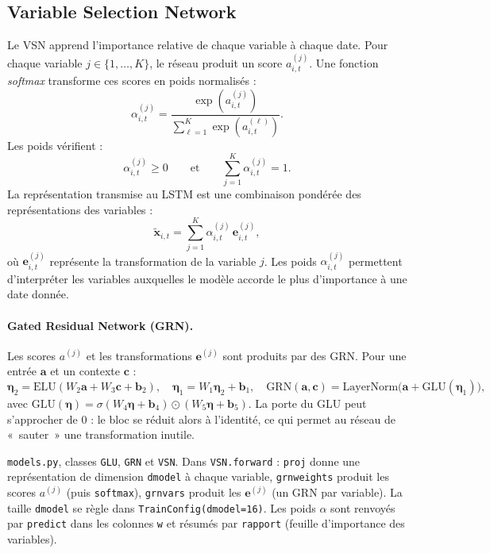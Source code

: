 \documentclass[11pt,a4paper]{article}
\renewcommand{\_}{\usorig\allowbreak}   %
\newcommand{\f}[1]{\texttt{#1}}        %
\begin{document}
\subsection{Variable Selection Network}\label{sec:vsn}
Le VSN apprend l'importance relative de chaque variable à chaque date. Pour chaque
variable $j\in\{1,\dots,K\}$, le réseau produit un score $a^{(j)}_{i,t}$. Une fonction
\emph{softmax} transforme ces scores en poids normalisés :
\[
  \alpha^{(j)}_{i,t} = \frac{\exp\left(a^{(j)}_{i,t}\right)}{\sum_{\ell=1}^{K}\exp\left(a^{(\ell)}_{i,t}\right)}.
\]
Les poids vérifient :
\[
  \alpha^{(j)}_{i,t} \ge 0 \qquad\text{et}\qquad \sum_{j=1}^{K}\alpha^{(j)}_{i,t} = 1.
\]
La représentation transmise au LSTM est une combinaison pondérée des représentations des
variables :
\[
  \tilde{\bm{x}}_{i,t} = \sum_{j=1}^{K}\alpha^{(j)}_{i,t}\,\bm{e}^{(j)}_{i,t},
\]
où $\bm{e}^{(j)}_{i,t}$ représente la transformation de la variable $j$. Les poids
$\alpha^{(j)}_{i,t}$ permettent d'interpréter les variables auxquelles le modèle accorde le
plus d'importance à une date donnée.

\paragraph{Gated Residual Network (GRN).} Les scores $a^{(j)}$ et les transformations
$\bm{e}^{(j)}$ sont produits par des GRN. Pour une entrée $\bm{a}$ et un contexte $\bm{c}$ :
\[
  \bm\eta_2 = \mathrm{ELU}(W_2\bm{a} + W_3\bm{c} + \bm b_2),\quad
  \bm\eta_1 = W_1\bm\eta_2 + \bm b_1,\quad
  \mathrm{GRN}(\bm a,\bm c) = \mathrm{LayerNorm}\big(\bm a + \mathrm{GLU}(\bm\eta_1)\big),
\]
avec $\mathrm{GLU}(\bm\eta) = \sigma(W_4\bm\eta + \bm b_4)\odot(W_5\bm\eta + \bm b_5)$. La
porte du GLU peut s'approcher de 0 : le bloc se réduit alors à l'identité, ce qui
permet au réseau de «~sauter~» une transformation inutile.

\begin{danslecode}
\f{models.py}, classes \f{GLU}, \f{GRN} et \f{VSN}. Dans \f{VSN.forward} :
\f{proj} donne une représentation de dimension \f{d\_model} à chaque variable,
\f{grn\_weights} produit les scores $a^{(j)}$ (puis \f{softmax}), \f{grn\_vars} produit les
$\bm e^{(j)}$ (un GRN par variable). La taille \f{d\_model} se règle dans
\f{TrainConfig(d\_model=16)}. Les poids $\alpha$ sont renvoyés par \f{predict} dans les
colonnes \f{w\_*} et résumés par \f{rapport} (feuille d'importance des variables).
\end{danslecode}
\end{document}
